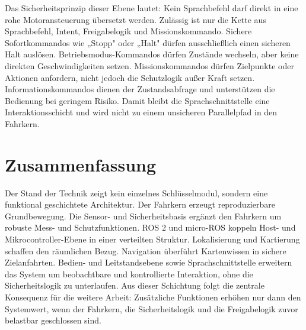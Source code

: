 Das Sicherheitsprinzip dieser Ebene lautet: Kein Sprachbefehl darf direkt in eine rohe Motoransteuerung übersetzt werden. Zulässig ist nur die Kette aus Sprachbefehl, Intent, Freigabelogik und Missionskommando. Sichere Sofortkommandos wie „Stopp" oder „Halt" dürfen ausschließlich einen sicheren Halt auslösen. Betriebsmodus-Kommandos dürfen Zustände wechseln, aber keine direkten Geschwindigkeiten setzen. Missionskommandos dürfen Zielpunkte oder Aktionen anfordern, nicht jedoch die Schutzlogik außer Kraft setzen. Informationskommandos dienen der Zustandsabfrage und unterstützen die Bedienung bei geringem Risiko. Damit bleibt die Sprachschnittstelle eine Interaktionsschicht und wird nicht zu einem unsicheren Parallelpfad in den Fahrkern.

\section{Zusammenfassung}

Der Stand der Technik zeigt kein einzelnes Schlüsselmodul, sondern eine funktional geschichtete Architektur. Der Fahrkern erzeugt reproduzierbare Grundbewegung. Die Sensor- und Sicherheitsbasis ergänzt den Fahrkern um robuste Mess- und Schutzfunktionen. ROS 2 und micro-ROS koppeln Host- und Mikrocontroller-Ebene in einer verteilten Struktur. Lokalisierung und Kartierung schaffen den räumlichen Bezug. Navigation überführt Kartenwissen in sichere Zielanfahrten. Bedien- und Leitstandsebene sowie Sprachschnittstelle erweitern das System um beobachtbare und kontrollierte Interaktion, ohne die Sicherheitslogik zu unterlaufen. Aus dieser Schichtung folgt die zentrale Konsequenz für die weitere Arbeit: Zusätzliche Funktionen erhöhen nur dann den Systemwert, wenn der Fahrkern, die Sicherheitslogik und die Freigabelogik zuvor belastbar geschlossen sind.

